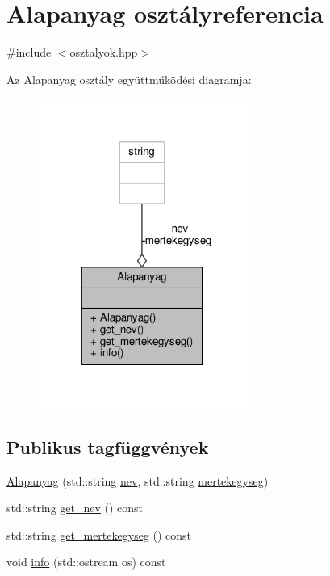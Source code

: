 \hypertarget{classAlapanyag}{}\section{Alapanyag osztályreferencia}
\label{classAlapanyag}


{\ttfamily \#include $<$osztalyok.\+hpp$>$}



Az Alapanyag osztály együttműködési diagramja\+:\nopagebreak
\begin{figure}[H]
\begin{center}
\leavevmode
\includegraphics[width=201pt]{classAlapanyag__coll__graph}
\end{center}
\end{figure}
\subsection*{Publikus tagfüggvények}
\begin{DoxyCompactItemize}
\item 
\hyperlink{classAlapanyag_ac50b052225836ada3e16d4b1624d885b}{Alapanyag} (std\+::string \hyperlink{classAlapanyag_a9c1f11bb5b17c2c897b8f3b9a6a8e502}{nev}, std\+::string \hyperlink{classAlapanyag_aa0bf609f16b9bcd79ba888991f01e48b}{mertekegyseg})
\item 
std\+::string \hyperlink{classAlapanyag_a77fde4a6af30c5fd1a95817b6c6804bb}{get\+\_\+nev} () const 
\item 
std\+::string \hyperlink{classAlapanyag_ad55d9eb66d0c958d5c38c716776cb7be}{get\+\_\+mertekegyseg} () const 
\item 
void \hyperlink{classAlapanyag_afb76b8324db797a066224f841d95bd47}{info} (std\+::ostream os) const 
\end{DoxyCompactItemize}
